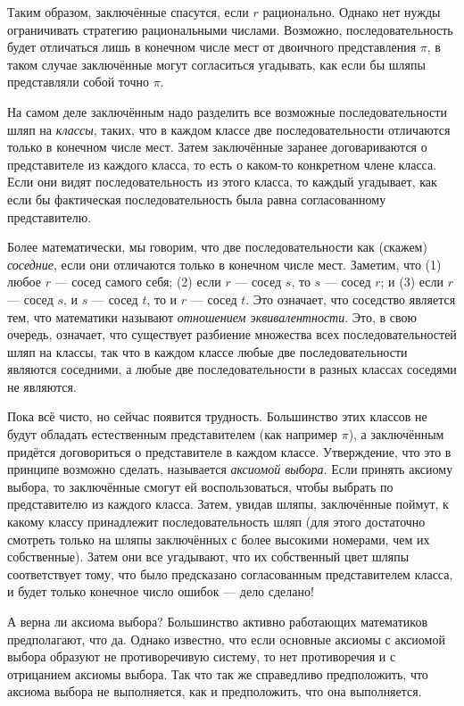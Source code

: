 Таким образом, заключённые спасутся, если $r$ рационально.
Однако нет нужды ограничивать стратегию рациональными числами.
Возможно, последовательность будет отличаться лишь в конечном числе мест от двоичного представления $\pi$, в таком случае заключённые могут согласиться угадывать, как если бы шляпы представляли собой точно $\pi$.

На самом деле заключённым надо разделить все возможные последовательности шляп на \emph{классы}, таких, что в каждом классе две последовательности отличаются только в конечном числе мест.
Затем заключённые заранее договариваются о представителе из каждого класса, то есть о каком-то конкретном члене класса.
Если они видят последовательность из этого класса, то каждый угадывает, как если бы фактическая последовательность была равна согласованному представителю.

Более математически, мы говорим, что две последовательности как (скажем) \emph{соседние}, если они отличаются только в конечном числе мест.
Заметим, что
(1) любое $r$ --- сосед самого себя;
(2) если $r$ --- сосед $s$, то $s$ --- сосед $r$; и
(3) если $r$ --- сосед $s$, и $s$ --- сосед $t$, то и $r$ --- сосед $t$.
Это означает, что соседство является тем, что математики называют \emph{отношением эквивалентности}.
Это, в свою очередь, означает, что существует разбиение множества всех последовательностей шляп на классы, так что в каждом классе любые две последовательности являются соседними, а любые две последовательности в разных классах соседями не являются.

Пока всё чисто, но сейчас появится трудность.
Большинство этих классов не будут обладать естественным представителем (как например $\pi$),
а заключённым придётся договориться о представителе в каждом классе.
Утверждение, что это в принципе возможно сделать, называется \emph{аксиомой выбора}.
Если принять аксиому выбора, то заключённые смогут ей воспользоваться, чтобы выбрать по представителю из каждого класса.
Затем, увидав шляпы, заключённые поймут, к какому классу принадлежит последовательность шляп (для этого достаточно смотреть только на шляпы заключённых с более высокими номерами, чем их собственные).
Затем они все угадывают, что их собственный цвет шляпы соответствует тому, что было предсказано согласованным представителем класса, и будет только конечное число ошибок --- дело сделано!

А верна ли аксиома выбора?
Большинство активно работающих математиков предполагают, что да.
Однако известно, что если основные аксиомы с аксиомой выбора образуют не противоречивую систему, то нет противоречия и с отрицанием аксиомы выбора.
Так что так же справедливо предположить, что аксиома выбора не выполняется, как и предположить, что она выполняется.

